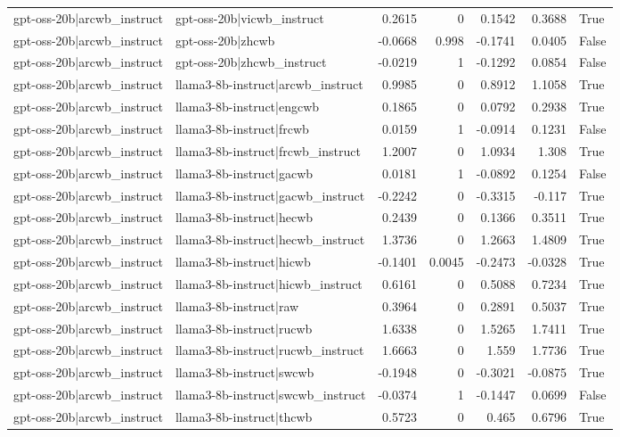 \begin{table}
\begin{tabular}{l l r r r r l}
gpt-oss-20b|arcwb_instruct & gpt-oss-20b|vicwb_instruct & 0.2615 & 0 & 0.1542 & 0.3688 & True \\
gpt-oss-20b|arcwb_instruct & gpt-oss-20b|zhcwb & -0.0668 & 0.998 & -0.1741 & 0.0405 & False \\
gpt-oss-20b|arcwb_instruct & gpt-oss-20b|zhcwb_instruct & -0.0219 & 1 & -0.1292 & 0.0854 & False \\
gpt-oss-20b|arcwb_instruct & llama3-8b-instruct|arcwb_instruct & 0.9985 & 0 & 0.8912 & 1.1058 & True \\
gpt-oss-20b|arcwb_instruct & llama3-8b-instruct|engcwb & 0.1865 & 0 & 0.0792 & 0.2938 & True \\
gpt-oss-20b|arcwb_instruct & llama3-8b-instruct|frcwb & 0.0159 & 1 & -0.0914 & 0.1231 & False \\
gpt-oss-20b|arcwb_instruct & llama3-8b-instruct|frcwb_instruct & 1.2007 & 0 & 1.0934 & 1.308 & True \\
gpt-oss-20b|arcwb_instruct & llama3-8b-instruct|gacwb & 0.0181 & 1 & -0.0892 & 0.1254 & False \\
gpt-oss-20b|arcwb_instruct & llama3-8b-instruct|gacwb_instruct & -0.2242 & 0 & -0.3315 & -0.117 & True \\
gpt-oss-20b|arcwb_instruct & llama3-8b-instruct|hecwb & 0.2439 & 0 & 0.1366 & 0.3511 & True \\
gpt-oss-20b|arcwb_instruct & llama3-8b-instruct|hecwb_instruct & 1.3736 & 0 & 1.2663 & 1.4809 & True \\
gpt-oss-20b|arcwb_instruct & llama3-8b-instruct|hicwb & -0.1401 & 0.0045 & -0.2473 & -0.0328 & True \\
gpt-oss-20b|arcwb_instruct & llama3-8b-instruct|hicwb_instruct & 0.6161 & 0 & 0.5088 & 0.7234 & True \\
gpt-oss-20b|arcwb_instruct & llama3-8b-instruct|raw & 0.3964 & 0 & 0.2891 & 0.5037 & True \\
gpt-oss-20b|arcwb_instruct & llama3-8b-instruct|rucwb & 1.6338 & 0 & 1.5265 & 1.7411 & True \\
gpt-oss-20b|arcwb_instruct & llama3-8b-instruct|rucwb_instruct & 1.6663 & 0 & 1.559 & 1.7736 & True \\
gpt-oss-20b|arcwb_instruct & llama3-8b-instruct|swcwb & -0.1948 & 0 & -0.3021 & -0.0875 & True \\
gpt-oss-20b|arcwb_instruct & llama3-8b-instruct|swcwb_instruct & -0.0374 & 1 & -0.1447 & 0.0699 & False \\
gpt-oss-20b|arcwb_instruct & llama3-8b-instruct|thcwb & 0.5723 & 0 & 0.465 & 0.6796 & True \\

\end{tabular}
\end{table}
